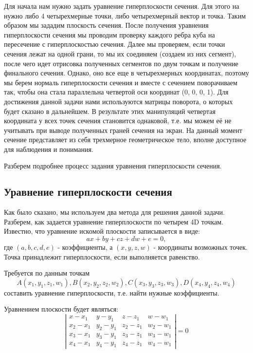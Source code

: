 \documentclass[12pt, a4paper, twoside]{report}
\begin{document}
Для начала нам нужно задать уравнение гиперплоскости сечения. Для этого на нужно либо 4 четырехмерные точки, либо четырехмерный вектор и точка. Таким образом мы зададим плоскость сечения. После получения уравнения гиперплоскости сечения мы проводим проверку каждого ребра куба на пересечение с гиперплоскостью сечения. Далее мы проверяем, если точки сечения лежат на одной грани, то мы их соединяем (создаем из них сегмент), после чего идет отрисовка полученных сегментов по двум точкам и получение финального сечения. Однако, оно все еще в четырехмерных координатах, поэтому мы берем нормаль гиперплоскости сечения и вместе с сечением поворачиваем так, чтобы она стала параллельна четвертой оси координат (0, 0, 0, 1). Для достижения данной задачи нами используются матрицы поворота, о которых будет сказано в дальнейшем. В результате этих манипуляций четвертая координата у всех точек сечения становится однаковой, т.е. мы можем её не учитывать при выводе полученных граней сечения на экран. На данный момент сечение представляет из себя трехмерное геометрическое тело, вполне доступное для наблюдения и понимания.

Разберем подробнее процесс задания уравнения гиперплоскости сечения.
\subsection{Уравнение гиперплоскости сечения}
Как было сказано, мы используем два метода для решения данной задачи. Разберем, как задается уравнение гиперплоскости по четырем 4D точкам.
Известно, что уравнение искомой плоскости записывается в виде:
$$ax + by + cz + dw + e=0,$$ где $(a,b,c,d,e)$ - коэффициенты, а $(x,y,z,w)$ - координаты возможных точек. Точка принадлежит гиперплоскости, если выполняется равенство.

Требуется по данным точкам $$A(x_1,y_1,z_1,w_1), B(x_2,y_2,z_2,w_2), C(x_3,y_3,z_3,w_3), D(x_4,y_4,z_4,w_4)$$ составить уравнение гиперплоскости, т.е. найти нужные коэффициенты.

Уравнением плоскости будет являться: $$ \left|
		\begin{array}{cccc}
			x-x_1 & y-y_1 & z-z_1 & w-w_1     \\
			x_2-x_1 & y_2-y_1 & z_2-z_1 & w_2-w_1    \\
			x_3-x_1 & y_3-y_1 & z_3-z_1 & w_3-w_1      \\
			x_4-x_1 & y_4-y_1 & z_4-z_1 & w_4-w_1 
		\end{array}
	\right|=0

$$
\end{document}
